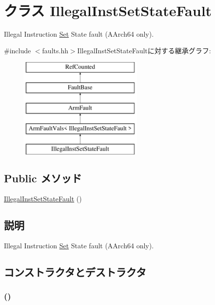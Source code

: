 \hypertarget{classArmISA_1_1IllegalInstSetStateFault}{
\section{クラス IllegalInstSetStateFault}
\label{classArmISA_1_1IllegalInstSetStateFault}
}


Illegal Instruction \hyperlink{classSet}{Set} State fault (AArch64 only).  


{\ttfamily \#include $<$faults.hh$>$}IllegalInstSetStateFaultに対する継承グラフ:\begin{figure}[H]
\begin{center}
\leavevmode
\includegraphics[height=5cm]{classArmISA_1_1IllegalInstSetStateFault}
\end{center}
\end{figure}
\subsection*{Public メソッド}
\begin{DoxyCompactItemize}
\item 
\hyperlink{classArmISA_1_1IllegalInstSetStateFault_ac09355fa32af8cd00c384c1aa9aff497}{IllegalInstSetStateFault} ()
\end{DoxyCompactItemize}


\subsection{説明}
Illegal Instruction \hyperlink{classSet}{Set} State fault (AArch64 only). 

\subsection{コンストラクタとデストラクタ}
\hypertarget{classArmISA_1_1IllegalInstSetStateFault_ac09355fa32af8cd00c384c1aa9aff497}{
\subsubsection[{IllegalInstSetStateFault}]{ ()}}
\label{classArmISA_1_1IllegalInstSetStateFault_ac09355fa32af8cd00c384c1aa9aff497}



